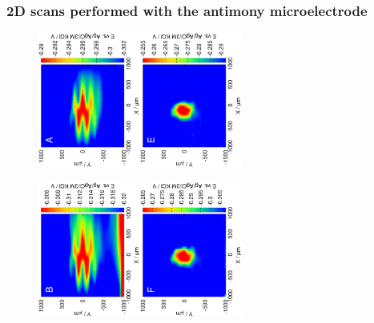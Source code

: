 	\subsubsection{2D scans performed with the antimony microelectrode}
\begin{figure}
\centering
\includegraphics[trim = 10mm 30mm 0mm 10mm, clip, width=0.3\textwidth, angle=-90]{img/pH_2D_Sb/13121313.eps}\includegraphics[trim = 10mm 30mm 0mm 10mm, clip, width=0.3\textwidth, angle=-90]{img/pH_2D_Sb/13121313_deconvoluted.eps}%

\includegraphics[trim = 10mm 30mm 0mm 10mm, clip, width=0.3\textwidth, angle=-90]{img/pH_2D_Sb/13121314.eps}\includegraphics[trim = 10mm 30mm 0mm 10mm, clip, width=0.3\textwidth, angle=-90]{img/pH_2D_Sb/13121314_deconvoluted.eps}


\end{figure}
